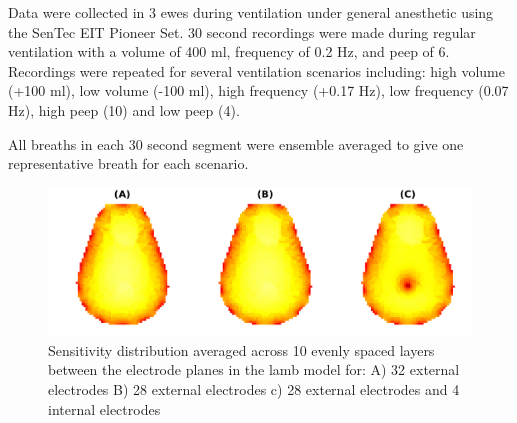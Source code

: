 Data were collected in 3 ewes during ventilation 
under general anesthetic using the
SenTec EIT Pioneer Set.
30 second recordings were
made during regular ventilation with a volume of 
400  ml, frequency of 0.2  Hz, and peep of 6.
Recordings were repeated for several 
ventilation scenarios including: high volume (+100 ml),
low volume (-100 ml), 
high frequency (+0.17 Hz), 
low frequency (0.07 Hz), 
high peep (10) and low peep (4). 

All breaths in each 30 second segment were 
ensemble averaged to 
give one representative breath for each scenario.
\begin{figure}
\centering
\includegraphics[width=.96\columnwidth]{chapter_5/imgs/lamb_sensitivity_profiles.pdf}
\caption[Sensitivity distribution in a lamb model]{\label{fig:sens_example}%
Sensitivity distribution averaged across 10 evenly spaced layers
between the electrode planes in the lamb model for: 
A) 32 external electrodes 
B) 28 external electrodes 
c) 28 external electrodes and 4 internal electrodes
}
\label{fig:sens_example}
\end{figure}

